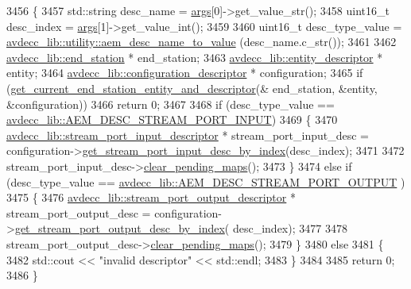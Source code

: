 \begin{DoxyCode}
3456 \{
3457     std::string desc\_name = \hyperlink{namespaceastime__fitline_a8187411843a6284ffb964ef3fb9fcab3}{args}[0]->get\_value\_str();
3458     uint16\_t desc\_index = \hyperlink{namespaceastime__fitline_a8187411843a6284ffb964ef3fb9fcab3}{args}[1]->get\_value\_int();
3459 
3460     uint16\_t desc\_type\_value = \hyperlink{namespaceavdecc__lib_1_1utility_a9f6076e32fa227555a95b6e95ea1e29b}{avdecc\_lib::utility::aem\_desc\_name\_to\_value}
      (desc\_name.c\_str());
3461 
3462     \hyperlink{classavdecc__lib_1_1end__station}{avdecc\_lib::end\_station} * end\_station;
3463     \hyperlink{classavdecc__lib_1_1entity__descriptor}{avdecc\_lib::entity\_descriptor} * entity;
3464     \hyperlink{classavdecc__lib_1_1configuration__descriptor}{avdecc\_lib::configuration\_descriptor} * configuration;
3465     \textcolor{keywordflow}{if} (\hyperlink{classcmd__line_ac2d4611fba7db03d436a2e3c1e64828e}{get\_current\_end\_station\_entity\_and\_descriptor}(&
      end\_station, &entity, &configuration))
3466         \textcolor{keywordflow}{return} 0;
3467 
3468     \textcolor{keywordflow}{if} (desc\_type\_value == \hyperlink{namespaceavdecc__lib_ac7b7d227e46bc72b63ee9e9aae15902fa54a680de439da84c5d5037a246d55b3f}{avdecc\_lib::AEM\_DESC\_STREAM\_PORT\_INPUT})
3469     \{
3470         \hyperlink{classavdecc__lib_1_1stream__port__input__descriptor}{avdecc\_lib::stream\_port\_input\_descriptor} * 
      stream\_port\_input\_desc = configuration->\hyperlink{classavdecc__lib_1_1configuration__descriptor_ad05646251e84a4024f317dd82395b8f7}{get\_stream\_port\_input\_desc\_by\_index}(desc\_index);
3471 
3472         stream\_port\_input\_desc->\hyperlink{classavdecc__lib_1_1stream__port__input__descriptor_ad7e55593254a186706fcd8d861ccdef8}{clear\_pending\_maps}();
3473     \}
3474     \textcolor{keywordflow}{else} \textcolor{keywordflow}{if} (desc\_type\_value == \hyperlink{namespaceavdecc__lib_ac7b7d227e46bc72b63ee9e9aae15902fa2b2dca37bb2c945a2b37b02231650b48}{avdecc\_lib::AEM\_DESC\_STREAM\_PORT\_OUTPUT}
      )
3475     \{
3476         \hyperlink{classavdecc__lib_1_1stream__port__output__descriptor}{avdecc\_lib::stream\_port\_output\_descriptor} * 
      stream\_port\_output\_desc = configuration->\hyperlink{classavdecc__lib_1_1configuration__descriptor_afc0e79843f9b98263f9be9d16197310b}{get\_stream\_port\_output\_desc\_by\_index}(
      desc\_index);
3477 
3478         stream\_port\_output\_desc->\hyperlink{classavdecc__lib_1_1stream__port__output__descriptor_ad7e55593254a186706fcd8d861ccdef8}{clear\_pending\_maps}();
3479     \}
3480     \textcolor{keywordflow}{else}
3481     \{
3482         std::cout << \textcolor{stringliteral}{"invalid descriptor"} << std::endl;
3483     \}
3484 
3485     \textcolor{keywordflow}{return} 0;
3486 \}
\end{DoxyCode}


